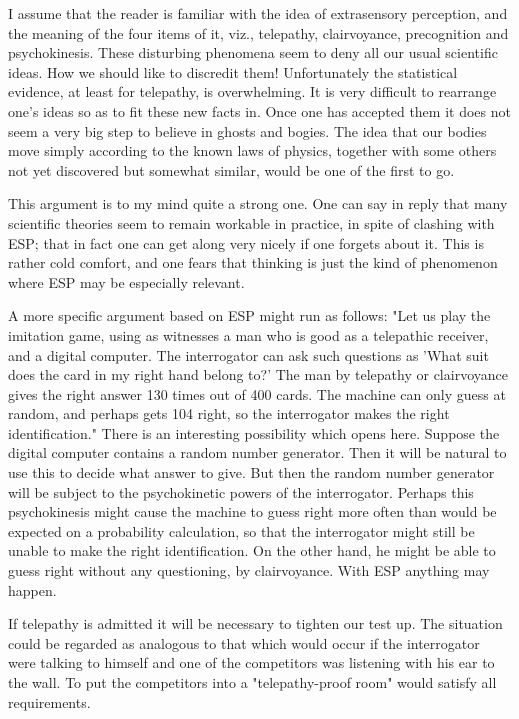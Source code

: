 \documentclass{article}
\begin{document}
I assume that the reader is familiar with the idea of extrasensory perception, and the meaning of the four items of it, viz., telepathy, clairvoyance, precognition and psychokinesis. These disturbing phenomena seem to deny all our usual scientific ideas. How we should like to discredit them! Unfortunately the statistical evidence, at least for telepathy, is overwhelming. It is very difficult to rearrange one's ideas so as to fit these new facts in. Once one has accepted them it does not seem a very big step to believe in ghosts and bogies. The idea that our bodies move simply according to the known laws of physics, together with some others not yet discovered but somewhat similar, would be one of the first to go.

This argument is to my mind quite a strong one. One can say in reply that many scientific theories seem to remain workable in practice, in spite of clashing with ESP; that in fact one can get along very nicely if one forgets about it. This is rather cold comfort, and one fears that thinking is just the kind of phenomenon where ESP may be especially relevant.

A more specific argument based on ESP might run as follows: "Let us play the imitation game, using as witnesses a man who is good as a telepathic receiver, and a digital computer. The interrogator can ask such questions as 'What suit does the card in my right hand belong to?' The man by telepathy or clairvoyance gives the right answer 130 times out of 400 cards. The machine can only guess at random, and perhaps gets 104 right, so the interrogator makes the right identification." There is an interesting possibility which opens here. Suppose the digital computer contains a random number generator. Then it will be natural to use this to decide what answer to give. But then the random number generator will be subject to the psychokinetic powers of the interrogator. Perhaps this psychokinesis might cause the machine to guess right more often than would be expected on a probability calculation, so that the interrogator might still be unable to make the right identification. On the other hand, he might be able to guess right without any questioning, by clairvoyance. With ESP anything may happen.

If telepathy is admitted it will be necessary to tighten our test up. The situation could be regarded as analogous to that which would occur if the interrogator were talking to himself and one of the competitors was listening with his ear to the wall. To put the competitors into a "telepathy-proof room" would satisfy all requirements.
\end{document}
